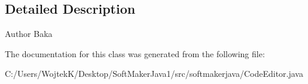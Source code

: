 \subsection{Detailed Description}
\begin{DoxyAuthor}{Author}
Baka 
\end{DoxyAuthor}


The documentation for this class was generated from the following file\+:\begin{DoxyCompactItemize}
\item 
C\+:/\+Users/\+Wojtek\+K/\+Desktop/\+Soft\+Maker\+Java1/src/softmakerjava/Code\+Editor.\+java\end{DoxyCompactItemize}

